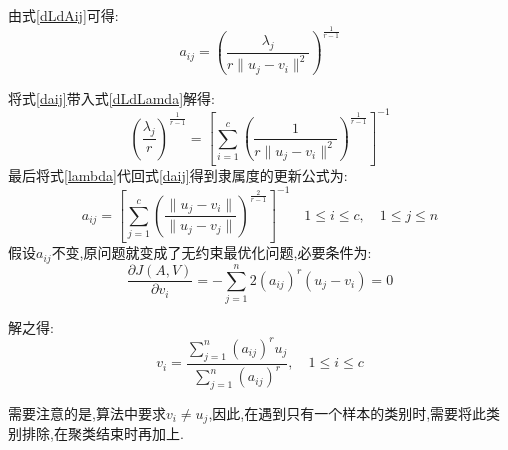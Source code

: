 由式\ref{dLdAij}可得:
\begin{equation}
    a_{i j}=\left( \frac{\lambda_j}{r \|u_{j}-v_{i}\|^2} \right)^{\frac{1}{r-1}}
    \label{daij}
\end{equation}

将式\ref{daij}带入式\ref{dLdLamda}解得:
\begin{equation}
    \left(\frac{\lambda_j}{r}\right)^{\frac{1}{r-1}}=\left[\sum\limits_{i=1}^c( \frac{1}{r \|u_{j}-v_{i}\|^2})^{\frac{1}{r-1}} \right]^{-1}
    \label{lambda}
\end{equation}
最后将式\ref{lambda}代回式\ref{daij}得到隶属度的更新公式为:
\begin{equation}
    a_{i j}=\left[\sum\limits_{j=1}^c\left( \frac{\|u_{j}-v_{i}\|}{\|u_{j}-v_{j}\|} \right)^{\frac{2}{r-1}}\right]^{-1}
    \quad 1 \leqslant i \leqslant c,\quad 1 \leqslant j \leqslant n
    \label{aij}
\end{equation}
假设$a_{i j}$不变,原问题就变成了无约束最优化问题,必要条件为:
\begin{equation}
        \frac{\partial J(A, V)}{\partial v_{i}}=-\sum_{j=1}^{n} 2\left(a_{i j}\right)^{r}\left(u_{j}-v_{i}\right)=0 
\end{equation}

解之得:
\begin{equation}
    v_{i}=\frac{\sum\limits_{j=1}^{n}\left(a_{i j}\right)^{r} u_{j}}{\sum\limits_{j=1}^{n}\left(a_{i j}\right)^{r}}, \quad 1 \leqslant i \leqslant c
    \label{vij}
\end{equation}
\par
需要注意的是,算法中要求$v_i \neq  u_j$,因此,在遇到只有一个样本的类别时,需要将此类别排除,在聚类结束时再加上.

